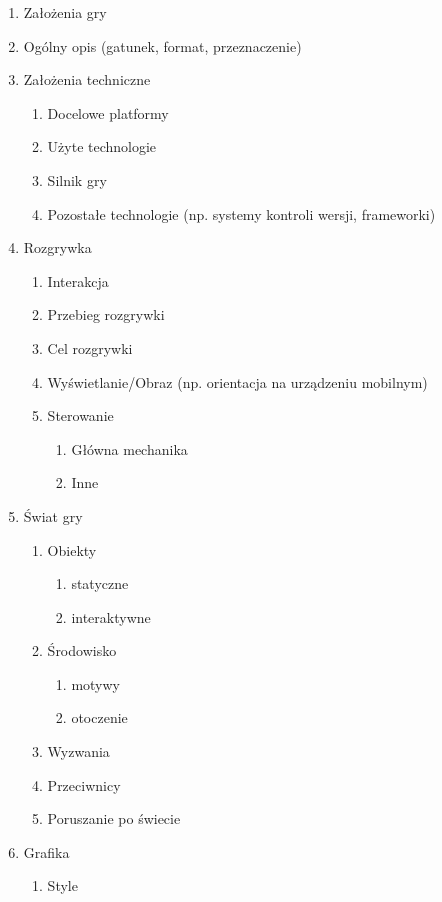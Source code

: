 \documentclass[12pt]{xmgr}
\begin{document}
\begin{enumerate}
  \item Założenia gry
  \item Ogólny opis (gatunek, format, przeznaczenie)
  \item Założenia techniczne
  \begin{enumerate}
    \item Docelowe platformy
    \item Użyte technologie
    \item Silnik gry
    \item Pozostałe technologie (np. systemy kontroli wersji, frameworki)
  \end{enumerate}
  \item Rozgrywka
  \begin{enumerate}
    \item Interakcja
    \item Przebieg rozgrywki
    \item Cel rozgrywki
    \item Wyświetlanie/Obraz (np. orientacja na urządzeniu mobilnym)
    \item Sterowanie
    \begin{enumerate}
      \item Główna mechanika
      \item Inne
    \end{enumerate}
  \end{enumerate}
  \item Świat gry
  \begin{enumerate}
    \item Obiekty
    \begin{enumerate}
      \item statyczne
      \item interaktywne
   \end{enumerate}
   \item Środowisko
   \begin{enumerate}
      \item motywy
      \item otoczenie
    \end{enumerate}
    \item Wyzwania 
    \item Przeciwnicy
    \item Poruszanie po świecie
  \end{enumerate}
  \item Grafika
  \begin{enumerate}
    \item Style

\end{enumerate}
\end{enumerate}
\end{document}
